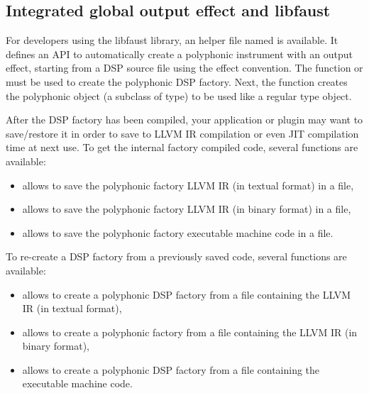 \subsection{Integrated global output effect and libfaust}

For developers using the libfaust library, an helper file named  is available. It defines an API to automatically create a polyphonic instrument with an output effect, starting from a DSP source file using the  effect  convention. The function  or  \\  must be used to create the polyphonic DSP factory. Next, the  function creates the polyphonic object (a subclass of  type) to be used like a regular  type object. 

After the DSP factory has been compiled, your application or plugin may want to save/restore it in order to save \faust to LLVM IR compilation or even JIT compilation time at next use. To get the internal factory compiled code, several functions are available:

\begin{itemize}
\item {} allows to save the polyphonic factory LLVM IR (in textual format) in a file,
\item {} allows to save the polyphonic factory LLVM IR (in binary format) in a file,
\item {} allows to save the polyphonic factory executable machine code in a file.
\end{itemize}

To re-create a DSP factory from a previously saved code, several functions are available:

\begin{itemize}
\item {} allows to create a polyphonic DSP factory from a file containing the LLVM IR (in textual format),
\item {} allows to create a polyphonic  factory from a file containing the LLVM IR (in binary format),
\item {} allows to create a polyphonic DSP factory from a file containing the executable machine code.
\end{itemize}
